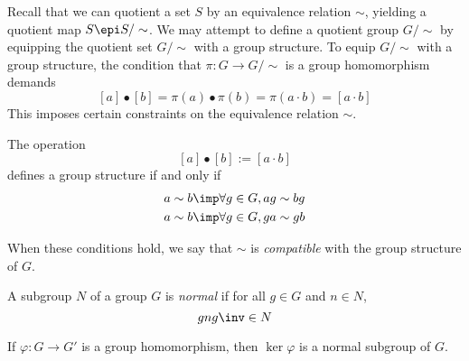 \documentclass{amsart}
\begin{document}
Recall that we can quotient a set $S$ by an equivalence relation $\sim$, yielding a quotient map $S \epi S/\sim$.
We may attempt to define a quotient group $G/\sim$ by equipping the quotient set $G/\sim$ with a group structure.
To equip $G/\sim$ with a group structure, the condition that $\pi : G \to G/\sim$ is a group homomorphism demands
\[
  [a] \bullet [b] = \pi(a) \bullet \pi(b) = \pi(a \cdot b) = [a \cdot b]
\]
This imposes certain constraints on the equivalence relation $\sim$.

\begin{lem}
  The operation
  \[
    [a] \bullet [b] := [a \cdot b]
  \]
  defines a group structure if and only if
  \begin{align}
    a \sim b &\imp \forall g \in G, ag \sim bg\\
    a \sim b &\imp \forall g \in G, ga \sim gb
  \end{align}
\end{lem}

When these conditions hold, we say that $\sim$ is \emph{compatible} with the group structure of $G$.

\begin{defn}
  A subgroup $N$ of a group $G$ is \emph{normal} if for all $g \in G$ and $n \in N$,
  \[
    gng\inv \in N
  \]
\end{defn}

\begin{lem}
  If $\varphi : G \to G'$ is a group homomorphism, then $\ker{\varphi}$ is a normal subgroup of $G$.
\end{lem}
\end{document}

